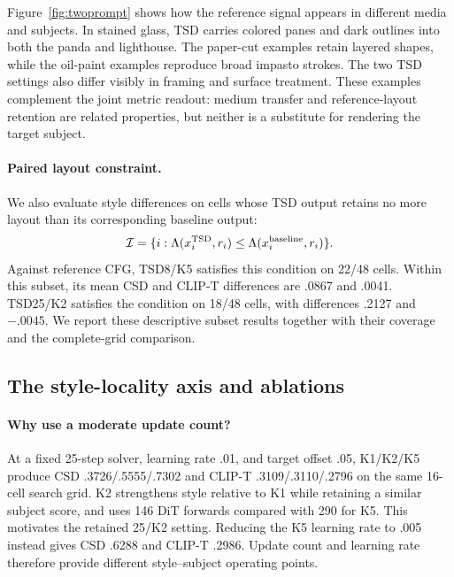 Figure~\ref{fig:twoprompt} shows how the reference signal appears in different
media and subjects. In stained glass, TSD carries colored panes and dark
outlines into both the panda and lighthouse. The paper-cut examples retain
layered shapes, while the oil-paint examples reproduce broad impasto strokes.
The two TSD settings also differ visibly in framing and surface treatment.
These examples complement the joint metric readout: medium transfer and
reference-layout retention are related properties, but neither is a
substitute for rendering the target subject.

\paragraph{Paired layout constraint.}
We also evaluate style differences on cells whose TSD output retains no
more layout than its corresponding baseline output:
\begin{equation}
\mathcal I=\{i:\Lambda(x_i^{\rm TSD},r_i)
\leq\Lambda(x_i^{\rm baseline},r_i)\}.
\label{eq:pairedconstraint}
\end{equation}
Against reference CFG, TSD8/K5 satisfies this condition on 22/48 cells.
Within this subset, its mean CSD and CLIP-T differences are .0867 and .0041.
TSD25/K2 satisfies the condition on 18/48 cells, with differences .2127
and $-.0045$. We report these descriptive subset results together with their
coverage and the complete-grid comparison.

\subsection{The style-locality axis and ablations}
\label{sec:interventioncontrols}
\paragraph{Why use a moderate update count?}
At a fixed 25-step solver, learning rate .01, and target offset .05,
K1/K2/K5 produce CSD .3726/.5555/.7302 and CLIP-T
.3109/.3110/.2796 on the same 16-cell search grid. K2 strengthens style
relative to K1 while retaining a similar subject score, and uses 146 DiT
forwards compared with 290 for K5. This motivates the retained 25/K2
setting. Reducing the K5 learning rate to .005 instead gives CSD .6288 and
CLIP-T .2986. Update count and learning rate therefore provide different
style--subject operating points.

